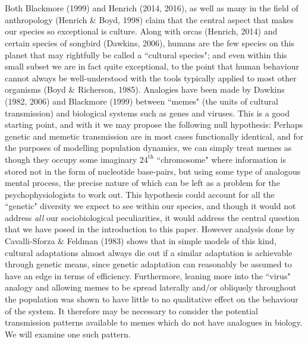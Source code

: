 \documentclass[a4paper,8pt]{extarticle}
\begin{document}
\\\\
Both Blackmore (1999) and Henrich (2014, 2016), as well as many in the field of anthropology (Henrich \& Boyd, 1998) claim that the central aspect that makes our species so exceptional is culture. Along with orcas (Henrich, 2014) and certain species of songbird (Dawkins, 2006), humans are  the few species on this planet that may rightfully be called a ``cultural species"; and even within this small subset we are in fact quite exceptional, to the point that human behaviour cannot always be well-understood with the tools typically applied to most other organisms (Boyd \& Richerson, 1985). Analogies have been made by Dawkins (1982, 2006) and Blackmore (1999) between ``memes" (the units of cultural transmission) and biological systems such as genes and viruses. This is a good starting point, and with it we may propose the following null hypothesis: Perhaps genetic and memetic transmission are in most cases functionally identical, and for the purposes of modelling population dynamics, we can simply treat memes as though they occupy some imaginary $24^{\text{th}}$ ``chromosome" where information is stored not in the form of nucleotide base-pairs, but using some type of analogous mental process, the precise nature of which can be left as a problem for the psychophysiologists to work out. This hypothesis could account for all the ``genetic" diversity we expect to see within our species, and though it would not address \emph{all} our sociobiological peculiarities, it would address the central question that we have posed in the introduction to this paper. However analysis done by Cavalli-Sforza \& Feldman (1983) shows that in simple models of this kind, cultural adaptations almost always die out if a similar adaptation is achievable through genetic means, since genetic adaptation can reasonably be assumed to have an edge in terms of efficiency. Furthermore, leaning more into the ``virus" analogy and allowing memes to be spread laterally and/or obliquely throughout the population was shown to have little to no qualitative effect on the behaviour of the system. It therefore may be necessary to consider the potential transmission patterns available to memes which do not have analogues in biology. We will examine one such pattern. 
\end{document}
